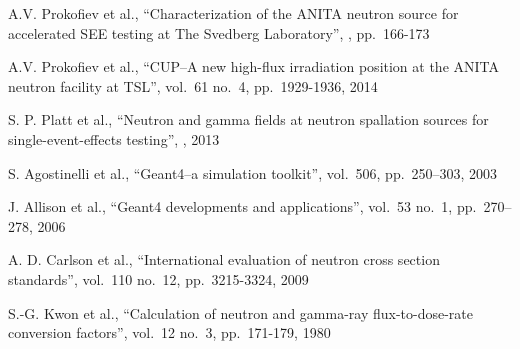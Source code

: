 \documentclass[peerreviewca,11pt,a4paper]{IEEEtran}
\renewcommand\todos{\relax}
\begin{document}
\begin{thebibliography}{9}
A.V. Prokofiev et al.,
\newblock ``Characterization of the ANITA neutron source for accelerated SEE testing at The Svedberg Laboratory'',
, pp.~166-173

A.V. Prokofiev et al.,
\newblock ``CUP--A new high-flux irradiation position at the ANITA neutron facility at TSL'',		 vol.~61 no.~4, pp.~1929-1936, 2014

S. P. Platt et al.,
\newblock ``Neutron and gamma fields at neutron spallation sources for single-event-effects testing'',
, 2013

S. Agostinelli et al.,
\newblock``Geant4--a simulation toolkit'',
 vol.~506, pp.~250--303, 2003

J. Allison et al.,
\newblock ``Geant4 developments and applications'',
 vol.~53 no.~1, pp.~270--278, 2006

A. D. Carlson et al.,
\newblock ``International evaluation of neutron cross section standards'',
 vol.~110 no.~12, pp.~3215-3324, 2009

S.-G. Kwon et al.,
\newblock ``Calculation of neutron and gamma-ray flux-to-dose-rate conversion factors'',
 vol.~12 no.~3, pp.~171-179, 1980

\end{thebibliography}

\cleardoublepage

\todos
\end{document}
